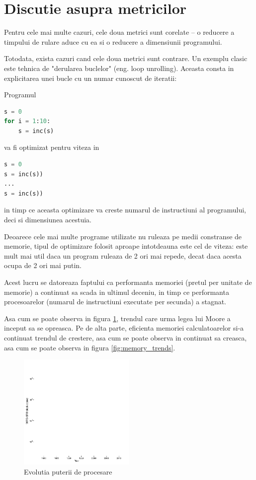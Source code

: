 \section{Discutie asupra metricilor}

Pentru cele mai multe cazuri, cele doua metrici sunt corelate --
o reducere a timpului de rulare aduce cu ea si o reducere a
dimensiunii programului.

Totodata, exista cazuri cand cele doua metrici sunt contrare.
Un exemplu clasic este tehnica de "derularea buclelor" (eng. loop
unrolling).
Aceasta consta in explicitarea unei bucle cu un numar cunoscut
de iteratii:

Programul
\begin{lstlisting}[language=Python]
s = 0
for i = 1:10:
    s = inc(s)
\end{lstlisting}

va fi optimizat pentru viteza in
\begin{lstlisting}[language=Python]
s = 0
s = inc(s))
...
s = inc(s))
\end{lstlisting}

in timp ce aceasta optimizare va creste numarul de instructiuni
al programului, deci si dimensiunea acestuia.

Deoarece cele mai multe programe utilizate nu ruleaza pe medii
constranse de memorie, tipul de optimizare folosit aproape
intotdeauna este cel de viteza: este mult mai util daca un
program ruleaza de 2 ori mai repede, decat daca acesta ocupa de
2 ori mai putin.

Acest lucru se datoreaza faptului ca performanta memoriei (pretul
per unitate de memorie) a continuat sa scada in ultimul deceniu,
in timp ce performanta procesoarelor (numarul de instructiuni
executate per secunda) a stagnat.

Asa cum se poate observa in figura \ref{fig:cpu_and_gpu_trends},
trendul care urma legea lui Moore \cite{moores_law} a inceput sa
se opreasca. Pe de alta parte, eficienta memoriei calculatoarelor
si-a continuat trendul de crestere, asa cum se poate observa in
continuat sa creasca, asa cum se poate observa in figura
\ref{fig:memory_trends}.

\begin{figure}
	\centering
	\includegraphics[width=0.5\textwidth]{cpu_and_gpu_trends}
	\caption{Evolutia puterii de procesare\cite{cpu_and_gpu_trends} }
	\label{fig:cpu_and_gpu_trends}
\end{figure}

